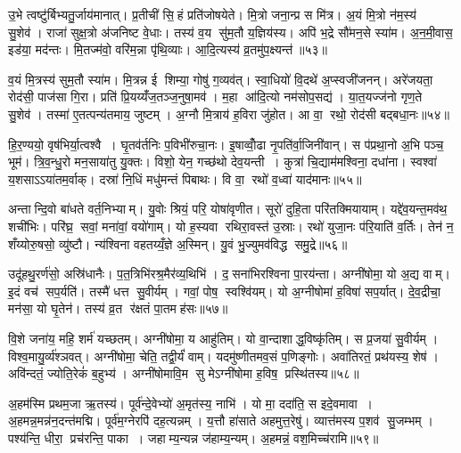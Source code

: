 उ॒भे त्वष्टु॑र्बिभ्यतु॒र्जाय॑मानात्। प्र॒तीची॑ सि॒हं प्रति॑जोषयेते। मि॒त्रो जना॒न्प्र स मि॑त्र। अ॒यं मि॒त्रो न॑म॒स्य॑ सु॒शेव॑। राजा॑ सुक्ष॒त्रो अ॑जनिष्ट वे॒धाः। तस्य॑ व॒य सु॑म॒तौ य॒ज्ञिय॑स्य। अपि॑ भ॒द्रे सौ॑मन॒से स्या॑म। अ॒न॒मी॒वास॒ इड॑या॒ मद॑न्तः। मि॒तज्म॑वो॒ वरि॑म॒न्ना पृ॑थि॒व्याः। आ॒दि॒त्यस्य॑ व्र॒तमु॑प॒क्ष्यन्त॑॥५३॥

व॒यं मि॒त्रस्य॑ सुम॒तौ स्या॑म। मि॒त्रन्न ई शिम्या॒ गोषु॑ ग॒व्यव॑त्। स्वा॒धियो॑ वि॒दथे॑ अ॒प्स्वजी॑जनन्। अरे॑जयता॒ रोद॑सी॒ पाज॑सा गि॒रा। प्रति॑ प्रि॒यय्यँ॑ज॒तञ्ज॒नुषा॒मव॑। म॒हा आ॑दि॒त्यो नम॑सोप॒सद्य॑। या॒त॒यज्ज॑नो गृण॒ते सु॒शेव॑। तस्मा॑ ए॒तत्पन्य॑तमाय॒ जुष्टम्। अ॒ग्नौ मि॒त्राय॑ ह॒विरा जु॑होत। आ वा॒ रथो॒ रोद॑सी बद्बधा॒नः॥५४॥

हि॒र॒ण्ययो॒ वृष॑भिर्या॒त्वश्वै। घृ॒तव॑र्तनिः प॒विभी॑रुचा॒नः। इ॒षाव्वोँ॒ढा नृ॒पति॑र्वा॒जिनी॑वान्। स प॑प्रथा॒नो अ॒भि पञ्च॒ भूम॑। त्रि॒व॒न्धु॒रो मन॒साया॑तु यु॒क्तः। विशो॒ येन॒ गच्छ॑थो देव॒यन्ती। कुत्रा॑ चि॒द्याम॑मश्विना॒ दधा॑ना। स्वश्वा॑ य॒शसाऽऽया॑तम॒र्वाक्। दस्रा॑ नि॒धिं मधु॑मन्तं पिबाथः। वि वा॒ रथो॑ व॒ध्वा॑ याद॑मानः॥५५॥

अन्तान्दि॒वो बा॑धते वर्त॒निभ्याम्। यु॒वोः श्रियं॒ परि॒ योषा॑वृणीत। सूरो॑ दुहि॒ता परि॑तक्मियायाम्। यद्दे॑व॒यन्त॒मव॑थ॒ शची॑भिः। परि॑घ्र॒ सवां॒ मना॑वां॒ वयो॑गाम्। यो ह॒स्यवा रथिरा॒वस्त॑ उ॒स्राः। रथो॑ युजा॒नः प॑रि॒याति॑ व॒र्तिः। तेन॑ न॒ शँय्योरु॒षसो॒ व्यु॑ष्टौ। न्य॑श्विना वहतय्यँ॒ज्ञे अ॒स्मिन्। यु॒वं भु॒ज्युमव॑विद्ध समु॒द्रे॥५६॥

उदू॑हथु॒रर्ण॑सो॒ अस्रि॑धानैः। प॒त॒त्रिभि॑रश्र॒मैर॑व्य॒थिभि॑। द॒सना॑भिरश्विना पा॒रय॑न्ता। अग्नी॑षोमा॒ यो अ॒द्य वाम्। इ॒दं वच॑ सप॒र्यति॑। तस्मै॑ धत्त सु॒वीर्यम्। गवां॒ पोष॒ स्वश्वि॑यम्। यो अ॒ग्नीषोमा॑ ह॒विषा॑ सप॒र्यात्। दे॒व॒द्रीचा॒ मन॑सा॒ यो घृ॒तेन॑। तस्य॑ व्र॒त र॑क्षतं पा॒तमह॑सः॥५७॥

वि॒शे जना॑य॒ महि॒ शर्म॑ यच्छतम्। अग्नी॑षोमा॒ य आहु॑तिम्। यो वा॒न्दाशाद्ध॒विष्कृ॑तिम्। स प्र॒जया॑ सु॒वीर्यम्। विश्व॒मायु॒र्व्य॑श्ञवत्। अग्नी॑षोमा॒ चेति॒ तद्वी॒र्यं॑ वाम्। यदमु॑ष्णीतमव॒सं प॒णिङ्गोः। अवा॑तिरतं॒ प्रथ॑यस्य॒ शेष॑। अवि॑न्दतं॒ ज्योति॒रेकं॑ ब॒हुभ्य॑। अग्नी॑षोमावि॒म सु मेऽग्नी॑षोमा ह॒विष॒ प्रस्थि॑तस्य॥५८॥\anuvakamend[ज॒भा॒र॒ द्यौर॒ग्नेरु॒पस्थ॑ उप॒क्ष्यन्तो॑ बद्बधा॒नो व॒ध्वा॑ याद॑मानः समु॒द्रेऽह॑स॒ प्रस्थि॑तस्य]

अ॒हम॑स्मि प्रथम॒जा ऋ॒तस्य॑। पूर्व॑न्दे॒वेभ्यो॑ अ॒मृत॑स्य॒ नाभि॑। यो मा॒ ददा॑ति॒ स इदे॒वमावा। अ॒हमन्न॒मन्न॑न॒दन्त॑मद्मि। पूर्व॑म॒ग्नेरपि॑ दह॒त्यन्नम्। य॒त्तौ हा॑साते अहमुत्त॒रेषु॑। व्यात्त॑मस्य प॒शव॑ सु॒जम्भम्। पश्य॑न्ति॒ धीरा॒ प्रच॑रन्ति॒ पाका। जहाम्य॒न्यन्न ज॑हाम्य॒न्यम्। अ॒हमन्नं॒ वश॒मिच्च॑रामि॥५९॥

